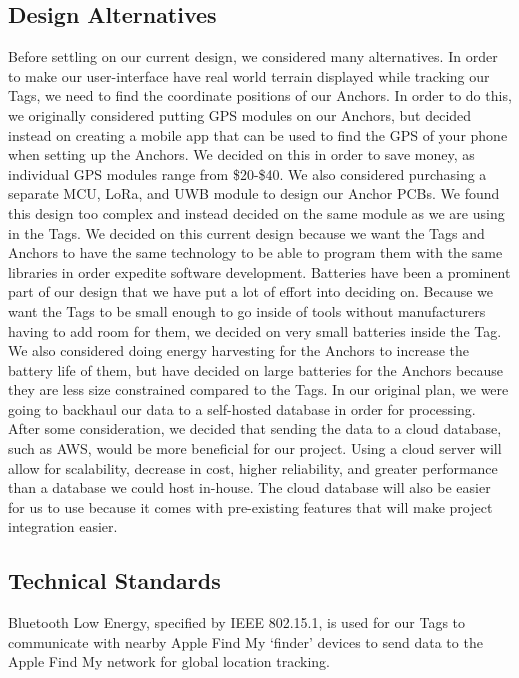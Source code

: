 \documentclass[conference]{IEEEtran}
\begin{document}
\subsection{Design Alternatives}
Before settling on our current design, we considered many alternatives. 
In order to make our user-interface have real world terrain displayed 
while tracking our Tags, we need to find the coordinate positions of our 
Anchors. In order to do this, we originally considered putting GPS 
modules on our Anchors, but decided instead on creating a mobile app 
that can be used to find the GPS of your phone when setting up the 
Anchors. We decided on this in order to save money, as individual GPS 
modules range from \$20-\$40. We also considered purchasing a separate 
MCU, LoRa, and UWB module to design our Anchor PCBs. We found this 
design too complex and instead decided on the same module as we are 
using in the Tags. We decided on this current design because we want 
the Tags and Anchors to have the same technology to be able to program 
them with the same libraries in order expedite software development. 
Batteries have been a prominent part of our design that we have put a 
lot of effort into deciding on. Because we want the Tags to be small 
enough to go inside of tools without manufacturers having to add room 
for them, we decided on very small batteries inside the Tag. We also 
considered doing energy harvesting for the Anchors to increase the 
battery life of them, but have decided on large batteries for the 
Anchors because they are less size constrained compared to the Tags. 
In our original plan, we were going to backhaul our data to a 
self-hosted database in order for processing. After some consideration, 
we decided that sending the data to a cloud database, such as AWS, 
would be more beneficial for our project. Using a cloud server will 
allow for scalability, decrease in cost, higher reliability, and 
greater performance than a database we could host in-house. The cloud 
database will also be easier for us to use because it comes with 
pre-existing features that will make project integration easier.

\subsection{Technical Standards}
Bluetooth Low Energy, specified by IEEE 802.15.1, is used for our Tags to 
communicate with nearby Apple Find My ‘finder’ devices to send data to the 
Apple Find My network for global location tracking.
\end{document}
